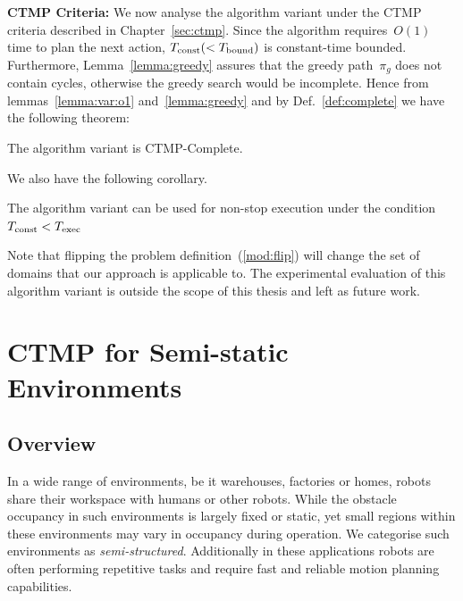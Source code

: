 \documentclass[a4paper]{report}
\begin{document}
\textbf{CTMP Criteria:} We now analyse the algorithm variant under the CTMP criteria described in Chapter~\ref{sec:ctmp}. Since the algorithm requires~$O(1)$ time to plan the next action, $T_\textrm{const} (< T_{\textrm{bound}})$ is constant-time bounded.
%
Furthermore, Lemma~\ref{lemma:greedy} assures that the greedy path~$\pi_g$ does not contain cycles, otherwise the greedy search would be incomplete. Hence from lemmas~\ref{lemma:var:o1} and~\ref{lemma:greedy} and by Def.~\ref{def:complete} we have the following theorem:

\vspace{2mm}
\begin{theorem}
	The algorithm variant is CTMP-Complete.
\end{theorem}

We also have the following corollary.

\vspace{2mm}
\begin{cor}
	The algorithm variant can be used for non-stop execution under the condition~$T_{\textrm{const}} < T_{\textrm{exec}}$
\end{cor}

Note that flipping the problem definition~(\ref{mod:flip}) will change the set of domains that our approach is applicable to. The experimental evaluation of this algorithm variant is outside the scope of this thesis and left as future work.

\newpage
\chapter{CTMP for Semi-static Environments}
\label{chap:icra}
\section{Overview}
In a wide range of environments, be it warehouses, factories or homes, robots share their workspace with humans or other robots. While the obstacle occupancy in such environments is largely fixed or static, yet small regions within these environments may vary in occupancy during operation. We categorise such environments as \emph{semi-structured}. Additionally in these applications robots are often performing repetitive tasks and require fast and reliable motion planning capabilities.
\end{document}
